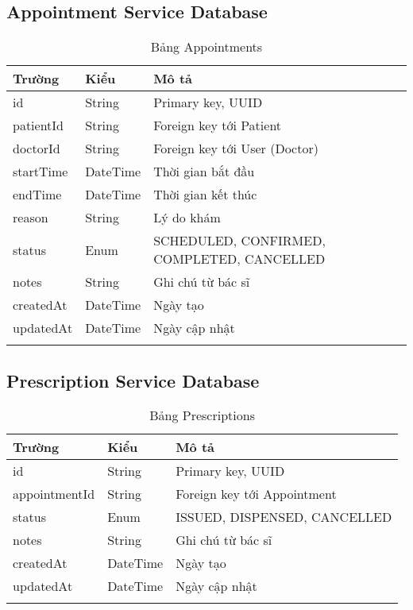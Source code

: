 \documentclass[12pt,a4paper]{report}
\begin{document}
\subsection{Appointment Service Database}
\begin{longtable}{|p{3cm}|p{2cm}|p{8cm}|}
\hline
\textbf{Trường} & \textbf{Kiểu} & \textbf{Mô tả} \\
\hline
id & String & Primary key, UUID \\
\hline
patientId & String & Foreign key tới Patient \\
\hline
doctorId & String & Foreign key tới User (Doctor) \\
\hline
startTime & DateTime & Thời gian bắt đầu \\
\hline
endTime & DateTime & Thời gian kết thúc \\
\hline
reason & String & Lý do khám \\
\hline
status & Enum & SCHEDULED, CONFIRMED, COMPLETED, CANCELLED \\
\hline
notes & String & Ghi chú từ bác sĩ \\
\hline
createdAt & DateTime & Ngày tạo \\
\hline
updatedAt & DateTime & Ngày cập nhật \\
\hline
\caption{Bảng Appointments}
\end{longtable}

\subsection{Prescription Service Database}
\begin{longtable}{|p{3cm}|p{2cm}|p{8cm}|}
\hline
\textbf{Trường} & \textbf{Kiểu} & \textbf{Mô tả} \\
\hline
id & String & Primary key, UUID \\
\hline
appointmentId & String & Foreign key tới Appointment \\
\hline
status & Enum & ISSUED, DISPENSED, CANCELLED \\
\hline
notes & String & Ghi chú từ bác sĩ \\
\hline
createdAt & DateTime & Ngày tạo \\
\hline
updatedAt & DateTime & Ngày cập nhật \\
\hline
\caption{Bảng Prescriptions}
\end{longtable}
\end{document}
